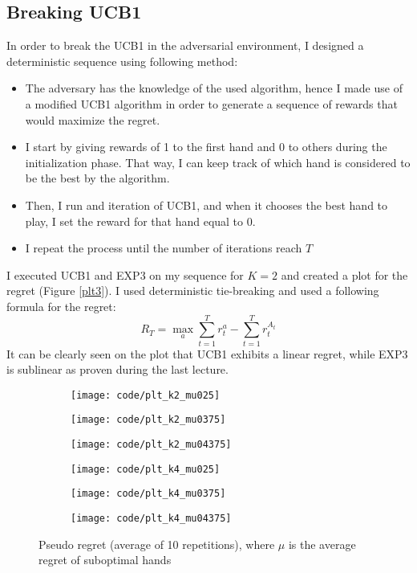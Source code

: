 \documentclass[a4paper]{article}
\begin{document}
\subsection{Breaking UCB1}
\label{subsec:52}
In order to break the UCB1 in the adversarial environment, I designed a
deterministic sequence using following method:
\begin{itemize}
\item The adversary has the knowledge of the used algorithm, hence I made use of
  a modified UCB1 algorithm in order to generate a sequence of rewards that
  would maximize the regret. 
\item I start by giving rewards of 1 to the first hand and 0 to others during the
  initialization phase. That way, I can keep track of  which hand is considered to be
  the best by the algorithm.
\item Then, I run and iteration of UCB1, and when it chooses the best hand to
  play, I set the reward for that hand equal to 0.
\item I repeat the process until the number of iterations reach $T$ 
\end{itemize}
I executed UCB1 and EXP3 on my sequence for $K=2$ and created a plot for the
regret (Figure \ref{plt3}). I used deterministic tie-breaking and used a
following formula for the regret:
\[
R_{T}=
\max _{a} \sum_{t=1}^{T} r_{t}^{a}-
\sum_{t=1}^{T} r_{t}^{A_{t}}
\]
It can be clearly seen on the plot that UCB1 exhibits a linear regret, while
EXP3 is sublinear as proven during the last lecture.
\begin{figure}
  \centering
  \begin{subfigure}[b]{0.49\textwidth}
    \centering
    \texttt{[image: code/plt\_k2\_mu025]}
  \end{subfigure}
  \begin{subfigure}[b]{0.49\textwidth}
    \centering
    \texttt{[image: code/plt\_k2\_mu0375]}
  \end{subfigure}
  \begin{subfigure}[b]{0.49\textwidth}
    \centering
    \texttt{[image: code/plt\_k2\_mu04375]}
  \end{subfigure}
  \begin{subfigure}[b]{0.49\textwidth}
    \centering
    \texttt{[image: code/plt\_k4\_mu025]}
  \end{subfigure}
  \begin{subfigure}[b]{0.49\textwidth}
    \centering
    \texttt{[image: code/plt\_k4\_mu0375]}
  \end{subfigure}
  \begin{subfigure}[b]{0.49\textwidth}
    \centering
    \texttt{[image: code/plt\_k4\_mu04375]}
  \end{subfigure}
  \caption{Pseudo regret (average of 10 repetitions), where $\mu$ is the average
    regret of suboptimal hands}
  \label{plt1}
\end{figure}
\end{document}
